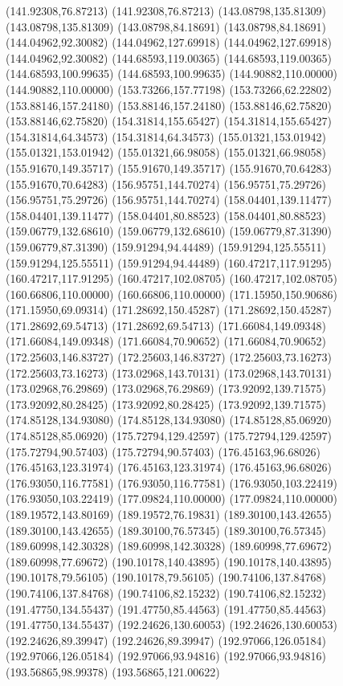 {(141.92308,76.87213) (141.92308,76.87213) (143.08798,135.81309) (143.08798,135.81309) (143.08798,84.18691) (143.08798,84.18691) (144.04962,92.30082) (144.04962,127.69918)
(144.04962,127.69918) (144.04962,92.30082) (144.68593,119.00365) (144.68593,119.00365) (144.68593,100.99635) (144.68593,100.99635) (144.90882,110.00000) (144.90882,110.00000)
(153.73266,157.77198) (153.73266,62.22802) (153.88146,157.24180) (153.88146,157.24180) (153.88146,62.75820) (153.88146,62.75820) (154.31814,155.65427) (154.31814,155.65427)
(154.31814,64.34573) (154.31814,64.34573) (155.01321,153.01942) (155.01321,153.01942) (155.01321,66.98058) (155.01321,66.98058) (155.91670,149.35717) (155.91670,149.35717)
(155.91670,70.64283) (155.91670,70.64283) (156.95751,144.70274) (156.95751,75.29726) (156.95751,75.29726) (156.95751,144.70274) (158.04401,139.11477) (158.04401,139.11477)
(158.04401,80.88523) (158.04401,80.88523) (159.06779,132.68610) (159.06779,132.68610) (159.06779,87.31390) (159.06779,87.31390) (159.91294,94.44489) (159.91294,125.55511)
(159.91294,125.55511) (159.91294,94.44489) (160.47217,117.91295) (160.47217,117.91295) (160.47217,102.08705) (160.47217,102.08705) (160.66806,110.00000) (160.66806,110.00000)
(171.15950,150.90686) (171.15950,69.09314) (171.28692,150.45287) (171.28692,150.45287) (171.28692,69.54713) (171.28692,69.54713) (171.66084,149.09348) (171.66084,149.09348)
(171.66084,70.90652) (171.66084,70.90652) (172.25603,146.83727) (172.25603,146.83727) (172.25603,73.16273) (172.25603,73.16273) (173.02968,143.70131) (173.02968,143.70131)
(173.02968,76.29869) (173.02968,76.29869) (173.92092,139.71575) (173.92092,80.28425) (173.92092,80.28425) (173.92092,139.71575) (174.85128,134.93080) (174.85128,134.93080)
(174.85128,85.06920) (174.85128,85.06920) (175.72794,129.42597) (175.72794,129.42597) (175.72794,90.57403) (175.72794,90.57403) (176.45163,96.68026) (176.45163,123.31974)
(176.45163,123.31974) (176.45163,96.68026) (176.93050,116.77581) (176.93050,116.77581) (176.93050,103.22419) (176.93050,103.22419) (177.09824,110.00000) (177.09824,110.00000)
(189.19572,143.80169) (189.19572,76.19831) (189.30100,143.42655) (189.30100,143.42655) (189.30100,76.57345) (189.30100,76.57345) (189.60998,142.30328) (189.60998,142.30328)
(189.60998,77.69672) (189.60998,77.69672) (190.10178,140.43895) (190.10178,140.43895) (190.10178,79.56105) (190.10178,79.56105) (190.74106,137.84768) (190.74106,137.84768)
(190.74106,82.15232) (190.74106,82.15232) (191.47750,134.55437) (191.47750,85.44563) (191.47750,85.44563) (191.47750,134.55437) (192.24626,130.60053) (192.24626,130.60053)
(192.24626,89.39947) (192.24626,89.39947) (192.97066,126.05184) (192.97066,126.05184) (192.97066,93.94816) (192.97066,93.94816) (193.56865,98.99378) (193.56865,121.00622)
}
